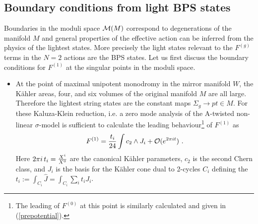 \documentclass[12pt]{article}
\begin{document}
\subsection{Boundary conditions from light BPS states}
\label{boundaryconditions}
Boundaries in the moduli space ${\cal M}(M)$ correspond to degenerations
of the manifold $M$ and general properties of the effective action can be inferred
from the physics of the lightest states. More precisely the light states relevant
to the $F^{(g)}$ terms in the $N=2$ actions are the BPS  states.
Let us first discuss the boundary conditions for $F^{(1)}$ at the singular points
in  the moduli space.
\begin{itemize}
\item At the point of maximal unipotent monodromy in the mirror manifold
$W$, the K\"ahler areas, four, and  six volumes of the original
manifold $M$ are all large. Therefore the lightest string states
are the constant maps $\Sigma_g\rightarrow pt\in M$. For these
Kaluza-Klein reduction, i.e. a zero mode analysis of the A-twisted
non-linear $\sigma$-model is sufficient to calculate the leading
behaviour\footnote{The leading of $F^{(0)}$  at this point is
similarly calculated  and given in (\ref{prepotential}).} of
$F^{(1)}$ as~\cite{BCOVI}
\begin{equation}
F^{(1)}={t_i\over 24} \int c_2 \wedge J_i+ {\cal O}(e^{2 \pi i t})\ .
\label{F1}
\end{equation}
Here   $2 \pi i \,t_i={X^i\over X^0}$ are the canonical K\"ahler parameters,
$c_2$ is the second Chern class, and $J_i$ is the basis for the
K\"ahler cone dual to 2-cycles $C_i$ defining the $t_i:=\int_{C_i} \hat J= \int_{C_i} \sum_{i} t_i J_i$.


\end{itemize}
\end{document}
